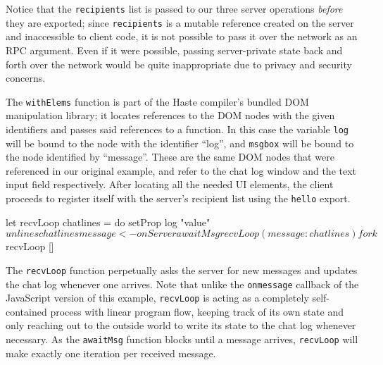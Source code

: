 \documentclass[preprint]{sigplanconf}
\begin{document}
\begin{code}
main :: App Done
main = do
  recipients <- liftServerIO $ CC.newMVar []

  hello <- export $ srvHello recipients
  awaitMsg <- export $ srvAwait recipients
  sendMsg <- export $ srvSend recipients

  runClient $ do
    withElems ["log","message"] $ \[log,msgbox] -> do
      onServer hello
\end{code}

Notice that the \lstinline!recipients! list is passed to our three server
operations \emph{before} they are exported; since \lstinline!recipients! is
a mutable reference created on the server and inaccessible to client code,
it is not possible to pass it over the network as an RPC argument.
Even if it were possible, passing server-private state back and forth over the
network would be quite inappropriate due to privacy and security concerns.

The \lstinline!withElems! function is part of the Haste compiler's bundled DOM
manipulation library; it locates references to the DOM nodes with the given
identifiers and passes said references to a function.
In this case the variable \lstinline!log! will be bound to the node
with the identifier ``log'', and \lstinline!msgbox! will be bound to the node
identified by ``message''. These are the same DOM nodes that were referenced in
our original example, and refer to the chat log window and the text input
field respectively. After locating all the needed UI elements, the client
proceeds to register itself with the server's recipient list using the
\lstinline!hello! export.

\begin{code}
      let recvLoop chatlines = do
            setProp log "value" $ unlines chatlines
            message <- onServer awaitMsg
            recvLoop (message : chatlines)
      fork $ recvLoop []
\end{code}

The \lstinline!recvLoop! function perpetually asks the server for new messages
and updates the chat log whenever one arrives. Note that unlike the
\lstinline!onmessage! callback of the JavaScript version of this example,
\lstinline!recvLoop! is acting as a completely self-contained process with
linear program flow, keeping track of its own state and only reaching out to
the outside world to write its state to the chat log whenever necessary. As
the \lstinline!awaitMsg! function blocks until a message arrives,
\lstinline!recvLoop! will make exactly one iteration per received message.
\end{document}
